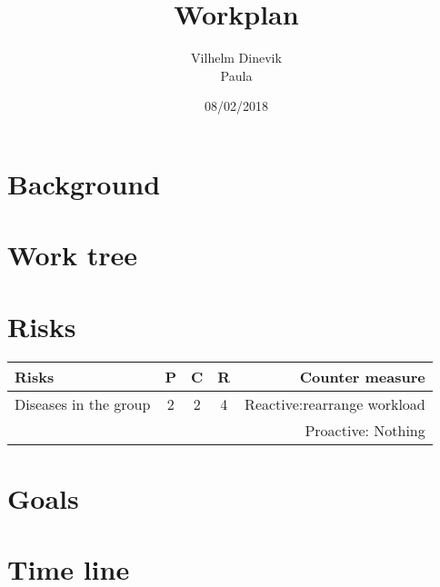 \documentclass{article}
\title{Workplan}
\author{Vilhelm Dinevik \\ Paula}
\date{08/02/2018}
\begin{document}
	\section{Background}
		
		
	\section{Work tree}
	
	\section{Risks}
		\begin{tabular}{|l|c|c|c|r|}			
			Risks & P & C & R & Counter measure \\
			\hline
			Diseases in the group  & 2 & 2 & 4 & Reactive:rearrange workload 				\\ & & & & Proactive: Nothing \\
			
				
		\end{tabular}		
	\section{Goals}
		
	\section{Time line}
	
\end{document}

